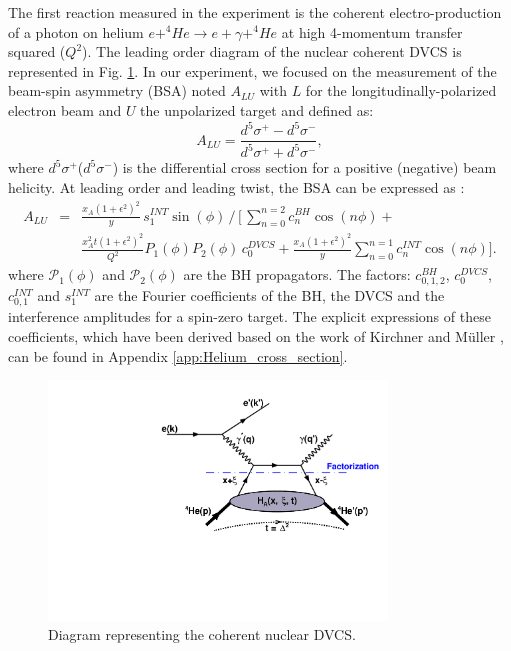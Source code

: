 \documentclass[aps,prc,preprint,superscriptaddress]{revtex4}
\begin{document}
The first reaction measured in the experiment is the coherent electro-production of a photon on helium
$e+^4\!\!He \rightarrow e+\gamma+^4\!\!He$ at high 4-momentum transfer squared ($Q^2$). The 
leading order diagram of the nuclear coherent DVCS is represented in Fig. \ref{fig:CohDiag}.
In our experiment, we focused on the measurement of the beam-spin asymmetry (BSA) noted $A_{LU}$ with 
$L$ for the longitudinally-polarized electron beam and $U$ the unpolarized target and defined as:  
\begin{equation}
A_{LU} = \frac{d^{5}\sigma^{+} - d^{5}\sigma^{-} }
              {d^{5}\sigma^{+} + d^{5}\sigma^{-}},
  \label{eq:BSA}
\end{equation}
where $d^{5}\sigma^{+}$($d^{5}\sigma^{-}$) is the differential cross section for a positive 
(negative) beam helicity. At leading order and leading twist, the BSA can be expressed as \cite{Kirchner:2003wt}:        
\begin{eqnarray}
\label{eq:coh_BSA}
A_{LU}& =& \frac{x_A(1+\epsilon^2)^2}{y} \, s_1^{INT} \sin(\phi) \, 
\bigg/ \, \bigg[ \, \sum_{n=0}^{n=2}c_n^{BH}\cos{(n\phi)} +  \\
& & \frac{x_A^2 t {(1+\epsilon^2)}^2}{Q^2} P_1(\phi) P_2(\phi) \, c_0^{DVCS} + 
\frac{x_A (1+\epsilon^2)^2}{y} \sum_{n=0}^{n=1} c_n^{INT} \cos{(n\phi)} \bigg].  \nonumber 
\end{eqnarray}
where $\mathcal{P}_1(\phi)$ and $\mathcal {P}_2(\phi)$ are the BH 
propagators. The factors: $c_{0,1,2}^{BH}$, $c_0^{DVCS}$, $c_{0,1}^{INT}$ and 
$s_1^{INT}$ are the Fourier coefficients of the BH, the DVCS and the 
interference amplitudes for a spin-zero target. The explicit 
expressions of these coefficients, which have been derived based on the work of 
Kirchner and Müller \cite{Kirchner:2003wt}, can be found in Appendix \ref{app:Helium_cross_section}.

\begin{figure}[tbp!]
\center
\includegraphics[width=9cm]{fig3/DVCS_diagram.pdf}
\caption{Diagram representing the coherent nuclear DVCS.}
\label{fig:CohDiag}
\end{figure}
\end{document}
